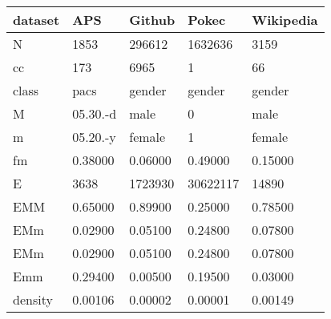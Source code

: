 \begin{tabular}{lllll}
\toprule
dataset &       APS &   Github &     Pokec & Wikipedia \\
\midrule
N       &      1853 &   296612 &   1632636 &      3159 \\
cc      &       173 &     6965 &         1 &        66 \\
class   &      pacs &   gender &    gender &    gender \\
M       &  05.30.-d &     male &         0 &      male \\
m       &  05.20.-y &   female &         1 &    female \\
fm      &   0.38000 &  0.06000 &   0.49000 &   0.15000 \\
E       &      3638 &  1723930 &  30622117 &     14890 \\
EMM     &   0.65000 &  0.89900 &   0.25000 &   0.78500 \\
EMm     &   0.02900 &  0.05100 &   0.24800 &   0.07800 \\
EMm     &   0.02900 &  0.05100 &   0.24800 &   0.07800 \\
Emm     &   0.29400 &  0.00500 &   0.19500 &   0.03000 \\
density &   0.00106 &  0.00002 &   0.00001 &   0.00149 \\
\bottomrule
\end{tabular}
